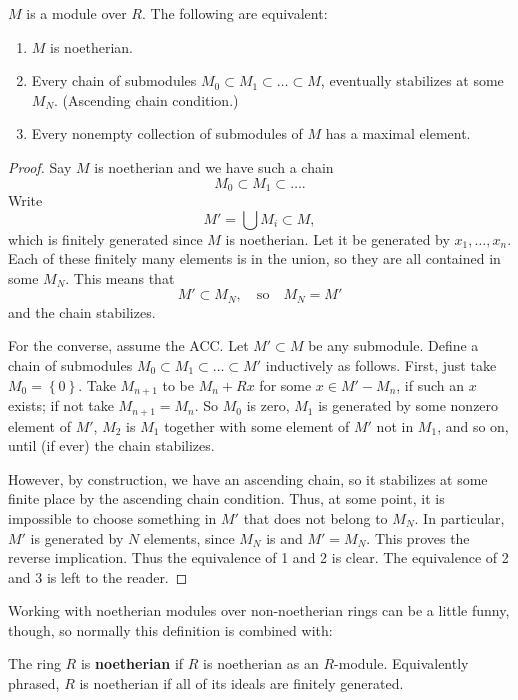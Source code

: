 \begin{proposition} $M$ is a module over $R$.
The following are equivalent:
\begin{enumerate}
\item $M$ is noetherian. 
\item Every chain of submodules  $M_0 \subset M_1 \subset \dots \subset M$,
eventually stabilizes at some $M_N$. (Ascending chain condition.)
\item Every nonempty collection of submodules of $M$ has a maximal element.
\end{enumerate}
\end{proposition} 
\begin{proof} 
Say $M$ is noetherian and we have such a chain
\[ M_0 \subset M_1 \subset \dots.  \]
Write
\[ M' = \bigcup M_i \subset M,  \]
which is finitely generated since $M$ is noetherian. Let it be generated by
$x_1, \dots,x_n$. Each of these finitely many elements is in the union, so
they are all contained in some $M_N$. This means that
\[ M' \subset M_N, \quad \mathrm{so} \quad M_N = M'  \]
and the chain stabilizes.

For the converse, assume the ACC.  Let $M' \subset M$ be any submodule.  Define
a chain of submodules $M_0 \subset M_1 \subset  \dots \subset M'$ inductively as follows. First, just take
$M_0 = \left\{0\right\}$. Take $M_{n+1}$ to be $M_n + Rx$ for  some $x \in
M' - M_n$, if such an $x$ exists; if not take $M_{n+1}=M_n$.  
So $M_0$ is zero,
$M_1$ is generated by some nonzero element of $M'$, $M_2$ is $M_1$ together
with some element of $M'$ not in $M_1$, and so on, until (if ever) the chain
stabilizes.

However, by construction, we have an ascending
chain, so it stabilizes at some finite place by the ascending chain condition.
Thus, at some point, it is
impossible to choose something in $M'$ that does not belong to  $M_N$. In
particular, $M'$ is generated by $N$ elements, since $M_N$ is and $M' = M_N$.
This proves the reverse implication. Thus the equivalence of 1 and 2 is clear.
The equivalence of 2 and 3 is left to the reader. 
\end{proof} 


Working with noetherian modules over non-noetherian rings can be a little
funny, though, so normally this definition is combined with:


\begin{definition} 
The ring $R$ is \textbf{noetherian} if $R$ is noetherian as an $R$-module.
Equivalently phrased, $R$ is noetherian if all of its ideals are finitely generated.
\end{definition} 

